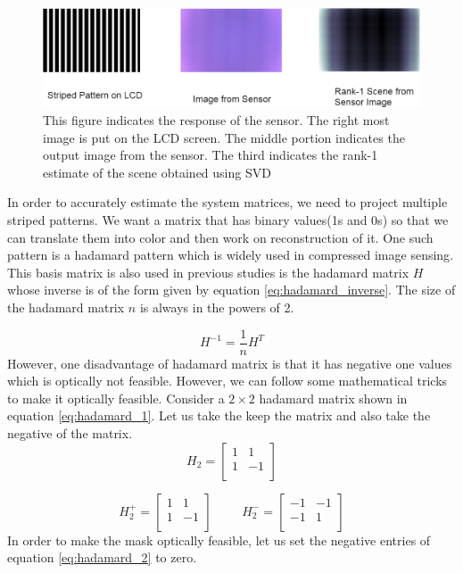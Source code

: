 \begin{figure}[h]
\centering
\includegraphics[width = \linewidth]{pics/Striped_Pattern_Response.png}
\caption{This figure indicates the response of the sensor. The right most image is put on the LCD screen. The middle portion indicates the output image from the sensor. The third indicates the rank-1 estimate of the scene obtained using SVD}
\label{fig:str_response}
\end{figure}

In order to accurately estimate the system matrices, we need to project multiple striped patterns. 
We want a matrix that has binary values(1s and 0s) so that we can translate them into color and then work on reconstruction of it. One such pattern is a hadamard pattern which is widely used in compressed image sensing\cite{hadamard}\cite{Flatcam}. This basis matrix is also used in previous studies is the hadamard matrix $H$ whose inverse is of the form given by equation \ref{eq:hadamard_inverse}. The size of the hadamard matrix $n$ is always in the powers of 2.

\begin{equation}
H^{-1} = \frac{1}{n} H^T
\label{eq:hadamard_inverse}
\end{equation}
However, one disadvantage of hadamard matrix is that it has negative one values which is optically not feasible. However, we can follow some mathematical tricks to make it optically feasible. Consider a $2 \times 2$ hadamard matrix shown in equation \ref{eq:hadamard_1}. Let us take the keep the matrix and also take the negative of the matrix.
\begin{equation}
H_2 = \begin{bmatrix} 
       1 & 1 \\
	   1 & -1 \\
    \end{bmatrix}
    \label{eq:hadamard_1}
\end{equation}

\begin{equation}
H_2^+ = \begin{bmatrix} 
       1 & 1 \\
	   1 & -1 \\
    \end{bmatrix}
   \hspace{1cm}
   H_2^- = \begin{bmatrix} 
       -1 & -1 \\
	   -1 & 1 \\
    \end{bmatrix}
    \label{eq:hadamard_2}
\end{equation}
In order to make the mask optically feasible, let us set the negative entries of equation \ref{eq:hadamard_2} to zero.

